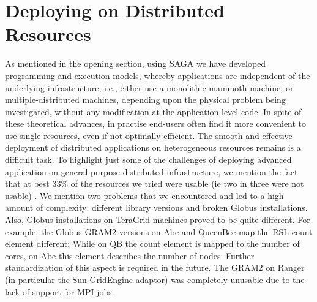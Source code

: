 \documentclass{llncs}
\begin{document}

\up

\section{Deploying on Distributed Resources}

\up

 

As mentioned in the opening section, using SAGA we have developed
programming and execution models, whereby applications are independent
of the underlying infrastructure, i.e., either use a monolithic
mammoth machine, or multiple-distributed machines, depending upon the
physical problem being investigated, without any modification at the
application-level code. In spite of these theoretical advances, in
practise end-users often find it more convenient to use single
resources, even if not optimally-efficient.  The smooth and effective
deployment of distributed applications on heterogeneous resources
remains is a difficult task.  To highlight just some of the challenges
of deploying advanced application on general-purpose distributed
infrastructure, we mention the fact that at best 33\% of the resources
we tried were usable (ie two in three were not usable) .  We mention
two problems that we encountered and led to a high amount of
complexity: different library versions and broken Globus
installations.  Also, Globus installations on TeraGrid machines proved
to be quite different.  For example, the Globus GRAM2 versions on Abe
and QueenBee map the RSL count element different: While on QB the
count element is mapped to the number of cores, on Abe this element
describes the number of nodes. Further standardization of this aspect
is required in the future. The GRAM2 on Ranger (in particular the Sun
GridEngine adaptor) was completely unusable due to the lack of support
for MPI jobs.

\end{document}
